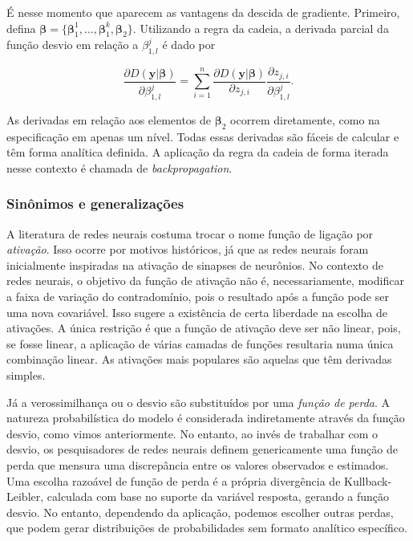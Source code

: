\documentclass[12pt,]{report}
\begin{document}
É nesse momento que aparecem as vantagens da descida de gradiente.
Primeiro, defina
\(\boldsymbol \beta = \{\boldsymbol \beta_1^1, \dots,\boldsymbol \beta_1^k,\boldsymbol \beta_2\}\).
Utilizando a regra da cadeia, a derivada parcial da função desvio em
relação a \(\beta_{1,l}^{j}\) é dado por

\[
\frac{\partial D(\mathbf y|\boldsymbol\beta)}{\partial \beta_{1,l}^{j}} = \sum_{i=1}^n\frac{\partial D(\mathbf y|\boldsymbol\beta)}{\partial z_{j,i}} \frac{\partial z_{j,i}}{\partial \beta_{1,l}^{j}} .
\]

As derivadas em relação aos elementos de \(\boldsymbol \beta_2\) ocorrem
diretamente, como na especificação em apenas um nível. Todas essas
derivadas são fáceis de calcular e têm forma analítica definida. A
aplicação da regra da cadeia de forma iterada nesse contexto é chamada
de \emph{backpropagation}.

\subsubsection{Sinônimos e
generalizações}\label{sinonimos-e-generalizacoes}

A literatura de redes neurais costuma trocar o nome função de ligação
por \emph{ativação}. Isso ocorre por motivos históricos, já que as redes
neurais foram inicialmente inspiradas na ativação de sinapses de
neurônios. No contexto de redes neurais, o objetivo da função de
ativação não é, necessariamente, modificar a faixa de variação do
contradomínio, pois o resultado após a função pode ser uma nova
covariável. Isso sugere a existência de certa liberdade na escolha de
ativações. A única restrição é que a função de ativação deve ser não
linear, pois, se fosse linear, a aplicação de várias camadas de funções
resultaria numa única combinação linear. As ativações mais populares são
aquelas que têm derivadas simples.

Já a verossimilhança ou o desvio são substituídos por uma \emph{função
de perda}. A natureza probabilística do modelo é considerada
indiretamente através da função desvio, como vimos anteriormente. No
entanto, ao invés de trabalhar com o desvio, os pesquisadores de redes
neurais definem genericamente uma função de perda que mensura uma
discrepância entre os valores observados e estimados. Uma escolha
razoável de função de perda é a própria divergência de Kullback-Leibler,
calculada com base no suporte da variável resposta, gerando a função
desvio. No entanto, dependendo da aplicação, podemos escolher outras
perdas, que podem gerar distribuições de probabilidades sem formato
analítico específico.
\end{document}
